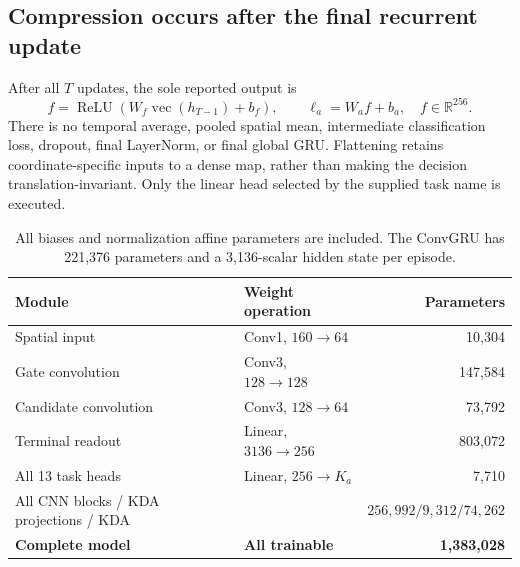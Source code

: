 \documentclass[10pt,letterpaper]{article}
\newcommand{\R}{\mathbb{R}}
\begin{document}
\subsection{Compression occurs after the final recurrent update}
After all $T$ updates, the sole reported output is
\begin{equation}
f=\operatorname{ReLU}(W_f\operatorname{vec}(h_{T-1})+b_f),\qquad
\ell_a=W_af+b_a,\quad f\in\R^{256}.\label{eq:head}
\end{equation}
There is no temporal average, pooled spatial mean, intermediate classification loss, dropout, final LayerNorm, or final global GRU. Flattening retains coordinate-specific inputs to a dense map, rather than making the decision translation-invariant. Only the linear head selected by the supplied task name is executed.
\begin{table}[h!]
\centering\small
\begin{tabular}{@{}llr@{}}\toprule
Module & Weight operation & Parameters\\\midrule
Spatial input & Conv1, $160\to64$ & 10,304\\
Gate convolution & Conv3, $128\to128$ & 147,584\\
Candidate convolution & Conv3, $128\to64$ & 73,792\\
Terminal readout & Linear, $3136\to256$ & 803,072\\
All 13 task heads & Linear, $256\to K_a$ & 7,710\\\midrule
All CNN blocks / KDA projections / KDA & & $256,992/9,312/74,262$\\
\textbf{Complete model} & \textbf{All trainable} & \textbf{1,383,028}\\\bottomrule
\end{tabular}
\caption{All biases and normalization affine parameters are included. The ConvGRU has 221,376 parameters and a 3,136-scalar hidden state per episode.}
\end{table}
\end{document}
